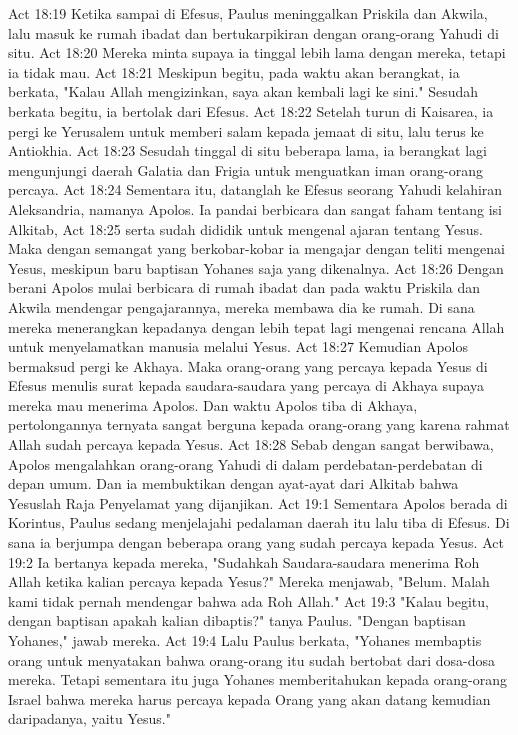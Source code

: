 Act 18:19  Ketika sampai di Efesus, Paulus meninggalkan Priskila dan Akwila, lalu masuk ke rumah ibadat dan bertukarpikiran dengan orang-orang Yahudi di situ.
Act 18:20  Mereka minta supaya ia tinggal lebih lama dengan mereka, tetapi ia tidak mau.
Act 18:21  Meskipun begitu, pada waktu akan berangkat, ia berkata, "Kalau Allah mengizinkan, saya akan kembali lagi ke sini." Sesudah berkata begitu, ia bertolak dari Efesus.
Act 18:22  Setelah turun di Kaisarea, ia pergi ke Yerusalem untuk memberi salam kepada jemaat di situ, lalu terus ke Antiokhia.
Act 18:23  Sesudah tinggal di situ beberapa lama, ia berangkat lagi mengunjungi daerah Galatia dan Frigia untuk menguatkan iman orang-orang percaya.
Act 18:24  Sementara itu, datanglah ke Efesus seorang Yahudi kelahiran Aleksandria, namanya Apolos. Ia pandai berbicara dan sangat faham tentang isi Alkitab,
Act 18:25  serta sudah dididik untuk mengenal ajaran tentang Yesus. Maka dengan semangat yang berkobar-kobar ia mengajar dengan teliti mengenai Yesus, meskipun baru baptisan Yohanes saja yang dikenalnya.
Act 18:26  Dengan berani Apolos mulai berbicara di rumah ibadat dan pada waktu Priskila dan Akwila mendengar pengajarannya, mereka membawa dia ke rumah. Di sana mereka menerangkan kepadanya dengan lebih tepat lagi mengenai rencana Allah untuk menyelamatkan manusia melalui Yesus.
Act 18:27  Kemudian Apolos bermaksud pergi ke Akhaya. Maka orang-orang yang percaya kepada Yesus di Efesus menulis surat kepada saudara-saudara yang percaya di Akhaya supaya mereka mau menerima Apolos. Dan waktu Apolos tiba di Akhaya, pertolongannya ternyata sangat berguna kepada orang-orang yang karena rahmat Allah sudah percaya kepada Yesus.
Act 18:28  Sebab dengan sangat berwibawa, Apolos mengalahkan orang-orang Yahudi di dalam perdebatan-perdebatan di depan umum. Dan ia membuktikan dengan ayat-ayat dari Alkitab bahwa Yesuslah Raja Penyelamat yang dijanjikan.
Act 19:1  Sementara Apolos berada di Korintus, Paulus sedang menjelajahi pedalaman daerah itu lalu tiba di Efesus. Di sana ia berjumpa dengan beberapa orang yang sudah percaya kepada Yesus.
Act 19:2  Ia bertanya kepada mereka, "Sudahkah Saudara-saudara menerima Roh Allah ketika kalian percaya kepada Yesus?" Mereka menjawab, "Belum. Malah kami tidak pernah mendengar bahwa ada Roh Allah."
Act 19:3  "Kalau begitu, dengan baptisan apakah kalian dibaptis?" tanya Paulus. "Dengan baptisan Yohanes," jawab mereka.
Act 19:4  Lalu Paulus berkata, "Yohanes membaptis orang untuk menyatakan bahwa orang-orang itu sudah bertobat dari dosa-dosa mereka. Tetapi sementara itu juga Yohanes memberitahukan kepada orang-orang Israel bahwa mereka harus percaya kepada Orang yang akan datang kemudian daripadanya, yaitu Yesus."
